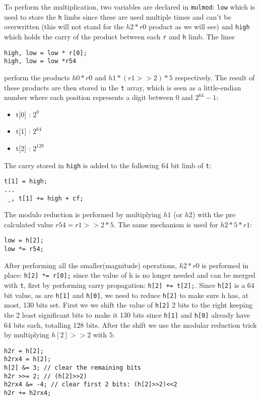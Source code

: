 \documentclass[twocolumn]{article}
\begin{document}
To perform the multiplication, two variables are declared in \texttt{mulmod}: \texttt{low} which is used to store the \texttt{h} limbs since these are used multiple
times and can't be overwritten (this will not stand for the $h2*r0$ product as we will see) and \texttt{high} which holds the carry of the product between 
each \texttt{r} and \texttt{h} limb. The lines 
\begin{verbatim}
high, low = low * r[0];
high, low = low *r54
\end{verbatim}
perform the products $h0*r0$ and $h1*(r1>>2)*5$ respectively.
The result of these products are then stored in the \texttt{t} array, which is seen as a little-endian number where each position represents a digit between $0$ 
and $2^{64}-1$: 
\begin{itemize}
    \item t[0] : $2^{0}$
    \item t[1] : $2^{64}$
    \item t[2] : $2^{128}$
\end{itemize}

The carry stored in \texttt{high} is added to the following 64 bit limb of \texttt{t}:
\begin{verbatim}
t[1] = high;
...
 _, t[1] += high + cf;
\end{verbatim}
The modulo reduction is performed by multiplying $h1$ (or $h2$) with the pre calculated value $r54=r1>>2*5$. The same mechanism is used for $h2*5*r1$:
\begin{verbatim}
low = h[2];
low *= r54;
\end{verbatim}

After performing all the smaller(magnitude) operations, $h2*r0$ is performed in place: \texttt{h[2] *= r[0];} since the value of h is no longer needed and
can be merged with \texttt{t}, first by performing carry propagation: \texttt{h[2] += t[2];}.
Since \texttt{h[2]} is a 64 bit value, as are \texttt{h[1]} and \texttt{h[0]}, we need to reduce \texttt{h[2]} to make sure h has, at most, 130 bits set. 
First we we shift the value of \texttt{h[2]} 2 bits to the right keeping the 2 least significant bits to make it 130 bits since \texttt{h[1]} and \texttt{h[0]}
already have 64 bits each, totalling 128 bits. After the shift we use the modular reduction trick by multiplying $h[2]>>2$ with $5$:
\begin{verbatim}
h2r = h[2];
h2rx4 = h[2];
h[2] &= 3; // clear the remaining bits
h2r >>= 2; // (h[2]>>2)
h2rx4 &= -4; // clear first 2 bits: (h[2]>>2)<<2
h2r += h2rx4;
\end{verbatim}
\end{document}
